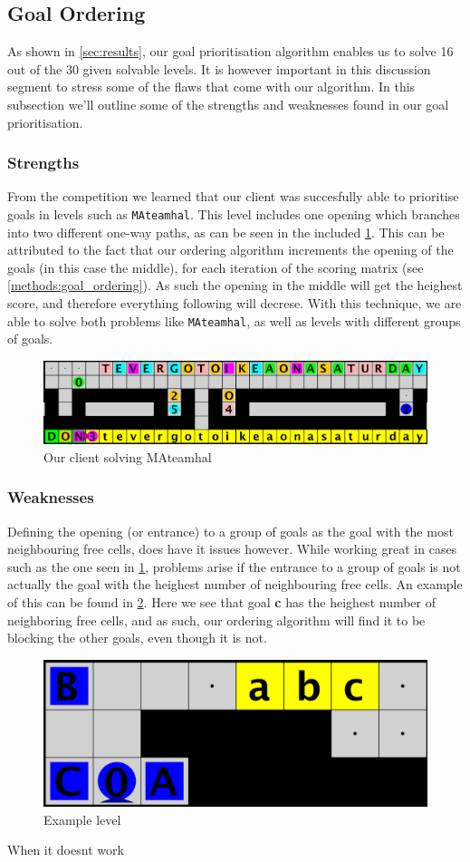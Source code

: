 \subsection{Goal Ordering}
\label{subsec:disc_goal_ordering}

As shown in \cref{sec:results}, our goal prioritisation algorithm enables us to solve 16 out of the 30 given solvable levels. 
It is however important in this discussion segment to stress some of the flaws that come with our algorithm. 
In this subsection we'll outline some of the strengths and weaknesses found in our goal prioritisation. 

\subsubsection{Strengths} From the competition we learned that our client was succesfully able to prioritise goals in levels such as \texttt{MAteamhal}. 
This level includes one opening which branches into two different one-way paths, as can be seen in the included \cref{fig:mateamhal}.
This can be attributed to the fact that our ordering algorithm increments the opening of the goals (in this case the middle), for each iteration of the scoring matrix (see \cref{methods:goal_ordering}). 
As such the opening in the middle will get the heighest score, and therefore everything following will decrese. 
With this technique, we are able to solve both problems like \texttt{MAteamhal}, as well as levels with different groups of goals. 

\begin{figure}[h!]
  \centering
  \includegraphics[width=.5\columnwidth]{graphics/mateahhal.png}
  \caption{\label{fig:mateamhal}Our client solving MAteamhal}
\end{figure}

\subsubsection{Weaknesses} Defining the opening (or entrance) to a group of goals as the goal with the most neighbouring free cells, does have it issues however. 
While working great in cases such as the one seen in \cref{fig:mateamhal}, problems arise if the entrance to a group of goals is not actually the goal with the heighest number of neighbouring free cells. 
An example of this can be found in \cref{fig:examplelev}.
Here we see that goal \textbf{c} has the heighest number of neighboring free cells, and as such, our ordering algorithm will find it to be blocking the other goals, even though it is not. 


\begin{figure}[h!]
  \centering
  \includegraphics[width=.5\columnwidth]{graphics/ordering_issue.png}
  \caption{\label{fig:examplelev}Example level}
\end{figure}
 

When it doesnt work